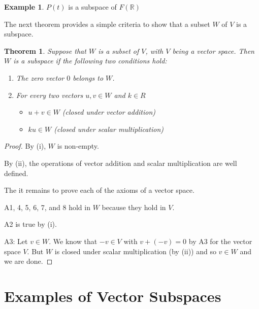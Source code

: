 \documentclass{report}
\newtheorem{_thm}{Theorem}
\theoremstyle{definition}
\newtheorem{ex}{Example}
\begin{document}
\begin{ex}
$P(t)$ is a subspace of $F(\mathbb{R})$
\end{ex}

The next theorem provides a simple criteria to show that a subset $W$ of $V$ is a subspace.

\begin{_thm}
Suppose that $W$ is a subset of $V$, with $V$ being a vector space. Then $W$ is a subspace if the following two conditions hold:
\begin{enumerate}[i]
 \item The zero vector $0$ belongs to $W$.
 \item For every two vectors $u,v\in W$ and $k\in R$
 \begin{itemize}
  \item $u+v\in W$ (closed under vector addition)
  \item $ku\in W$ (closed under scalar multiplication)
 \end{itemize}
\end{enumerate}
\end{_thm}

\begin{proof}
By (i), $W$ is non-empty.

By (ii), the operations of vector addition and scalar multiplication are well defined.

The it remains to prove each of the axioms of a vector space.

A1, 4, 5, 6, 7, and 8 hold in $W$ because they hold in $V$.

A2 is true by (i).

A3: Let $v\in W$.
We know that $-v\in V$ with $v+(-v)=0$ by A3 for the vector space $V$.
But $W$ is closed under scalar multiplication (by (ii)) and so $v\in W$ and we are done.
\end{proof}

\section{Examples of Vector Subspaces}
\end{document}
